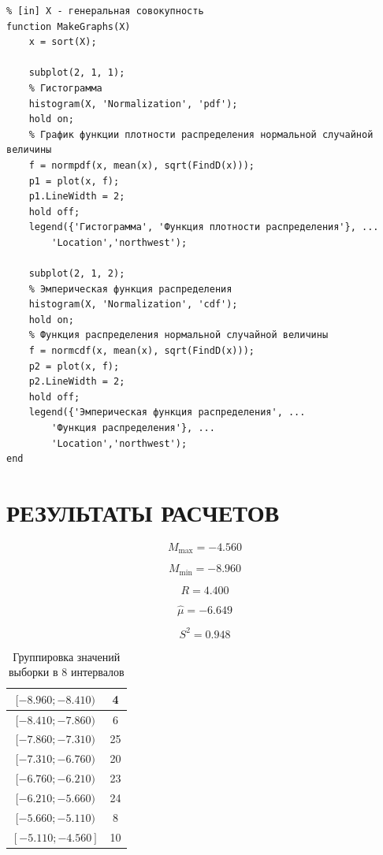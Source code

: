 \begin{lstlisting}[caption=Рисование графиков]
% Функция для рисования графиков
% [in] X - генеральная совокупность
function MakeGraphs(X)
    x = sort(X);

    subplot(2, 1, 1);
    % Гистограмма
    histogram(X, 'Normalization', 'pdf');
    hold on;
    % График функции плотности распределения нормальной случайной величины
    f = normpdf(x, mean(x), sqrt(FindD(x)));
    p1 = plot(x, f);
    p1.LineWidth = 2;
    hold off;
    legend({'Гистограмма', 'Функция плотности распределения'}, ...
        'Location','northwest');

    subplot(2, 1, 2);
    % Эмперическая функция распределения
    histogram(X, 'Normalization', 'cdf');
    hold on;
    % Функция распределения нормальной случайной величины
    f = normcdf(x, mean(x), sqrt(FindD(x)));
    p2 = plot(x, f);
    p2.LineWidth = 2;
    hold off;
    legend({'Эмперическая функция распределения', ...
        'Функция распределения'}, ...
        'Location','northwest');
end
\end{lstlisting}

\section{РЕЗУЛЬТАТЫ РАСЧЕТОВ}

\begin{equation*}
    M_{\max} = -4.560
\end{equation*}

\begin{equation*}
    M_{\min} = -8.960
\end{equation*}

\begin{equation*}
    R = 4.400
\end{equation*}

\begin{equation*}
    \hat \mu = -6.649
\end{equation*}

\begin{equation*}
    S^2 = 0.948
\end{equation*}

\setlength\extrarowheight{4pt}
\begin{table}[H]
    \centering
    \begin{tabular}{|c|c|}
        \hline
        $[-8.960; -8.410)$ & 4 \\
        \hline
        $[-8.410; -7.860)$ & 6 \\
        \hline
        $[-7.860; -7.310)$ & 25 \\
        \hline
        $[-7.310; -6.760)$ & 20 \\
        \hline
        $[-6.760; -6.210)$ & 23 \\
        \hline
        $[-6.210; -5.660)$ & 24 \\
        \hline
        $[-5.660; -5.110)$ & 8 \\
        \hline
        $[-5.110; -4.560]$ & 10 \\
        \hline
    \end{tabular}
    \caption{Группировка значений выборки в 8 интервалов}
\end{table}

